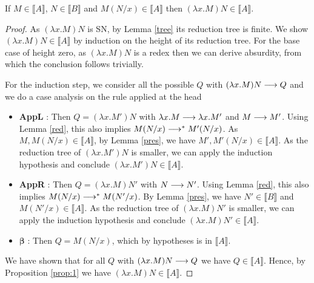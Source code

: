 \documentclass[]{StandardTemplate}
\begin{document}
\begin{prop}
  \label{abs}
If $ M \in \llbracket A \rrbracket $, $ N \in \llbracket B \rrbracket $ and $ M(N/x) \in \llbracket A \rrbracket $ then $ (\lambda x . M) N \in \llbracket A \rrbracket $.
\end{prop}
\begin{proof}
  As $ (\lambda x . M) N $ is SN, by Lemma \ref{tree} its reduction tree is finite. We show $(\lambda x . M) N \in \llbracket A \rrbracket$ by induction on the height of its reduction tree. For the base case of height zero, as $ (\lambda x . M) N $ is a redex then we can derive absurdity, from which the conclusion follows trivially.

  For the induction step, we consider all the possible $ Q $ with $ (\lambda x . M) N \longrightarrow Q $ and we do a case analysis on the rule applied at the head
  \begin{itemize}
  \item \textbf{AppL} : Then $ Q = (\lambda x. M')N $ with $ \lambda x.M \longrightarrow \lambda x.M' $ and $ M \longrightarrow M' $. Using Lemma \ref{red}, this also implies $ M(N/x) \longrightarrow^* M'(N/x) $. As $ M, M(N/x) \in \llbracket A \rrbracket $, by Lemma \ref{pres}, we have $ M', M'(N/x) \in \llbracket A \rrbracket $. As the reduction tree of $  (\lambda x. M')N $ is smaller, we can apply the induction hypothesis and conclude $(\lambda x. M')N \in \llbracket A \rrbracket$.
  \item \textbf{AppR} : Then $ Q =  (\lambda x. M)N' $ with $ N \longrightarrow N' $. Using Lemma \ref{red}, this also implies $ M(N/x) \longrightarrow^* M(N'/x) $. By Lemma \ref{pres}, we have $ N' \in \llbracket B\rrbracket $ and $M(N'/x) \in \llbracket A \rrbracket $. As the reduction tree of $  (\lambda x. M)N' $ is smaller, we can apply the induction hypothesis and conclude $(\lambda x. M)N' \in \llbracket A \rrbracket$.
  \item $ \boldsymbol\beta $ : Then $ Q = M(N/x) $, which by hypotheses is in $ \llbracket A \rrbracket $.
  \end{itemize}

  We have shown that for all $ Q $ with $ (\lambda x. M)N \longrightarrow Q $ we have $ Q \in \llbracket A \rrbracket $. Hence, by Proposition \ref{prop:1} we have $ (\lambda x. M)N \in \llbracket A \rrbracket $.
\end{proof}
\end{document}
